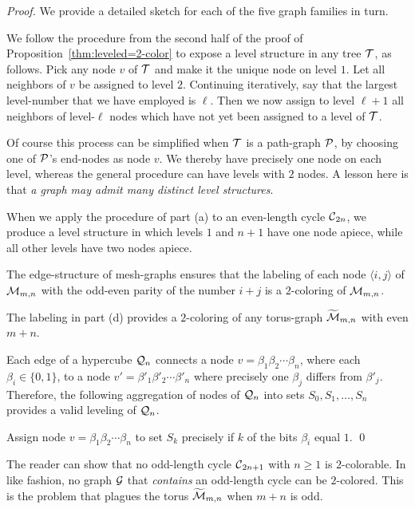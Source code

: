 \begin{proof}
We provide a detailed sketch for each of the five graph families in
turn.

We follow the procedure from the second half of the proof of
Proposition~\ref{thm:leveled=2-color} to expose a level structure in
any tree $\mbox{$\cal T$}$, as follows.  Pick any node $v$ of $\mbox{$\cal T$}$ and make it the
unique node on level $1$.  Let all neighbors of $v$ be assigned to
level $2$.  Continuing iteratively, say that the largest level-number
that we have employed is $\ell$.  Then we now assign to level $\ell
+1$ all neighbors of level-$\ell$ nodes which have not yet been
assigned to a level of $\mbox{$\cal T$}$.

Of course this process can be simplified when $\mbox{$\cal T$}$ is a path-graph
$\mbox{$\cal P$}$, by choosing one of $\mbox{$\cal P$}$'s end-nodes as node $v$.  We thereby
have precisely one node on each level, whereas the general procedure
can have levels with $2$ nodes.  A lesson here is that {\em a graph
  may admit many distinct level structures}.

\medskip

When we apply the procedure of part (a) to an even-length cycle
$\mbox{$\cal C$}_{2n}$, we produce a level structure in which levels $1$ and $n+1$
have one node apiece, while all other levels have two nodes apiece.

\medskip

The edge-structure of mesh-graphs ensures that the labeling of each
node $\langle i,j \rangle$ of $\mbox{$\cal M$}_{m,n}$ with the odd-even parity of
the number $i+j$ is a $2$-coloring of $\mbox{$\cal M$}_{m,n}$.

\medskip

The labeling in part (d) provides a $2$-coloring of any torus-graph
$\widetilde{\mbox{$\cal M$}}_{m,n}$ with even $m+n$.

\medskip

Each edge of a hypercube $\mbox{$\cal Q$}_n$ connects a node $v = \beta_1 \beta_2
\cdots \beta_n$, where each $\beta_i \in \{0,1\}$, to a node $v' =
\beta'_1 \beta'_2 \cdots \beta'_n$ where precisely one $\beta_j$
differs from $\beta'_j$.  Therefore, the following aggregation of
nodes of $\mbox{$\cal Q$}_n$ into sets $S_0, S_1, \ldots, S_n$ provides a valid
leveling of $\mbox{$\cal Q$}_n$.

Assign node $v = \beta_1 \beta_2 \cdots \beta_n$ to set $S_k$
precisely if $k$ of the bits $\beta_i$ equal $1$.
\qed
\end{proof}

The reader can show that no odd-length cycle $\mbox{$\cal C$}_{2n+1}$ with $n \geq
1$ is $2$-colorable.  In like fashion, no graph $\mbox{$\cal G$}$ that {\em
  contains} an odd-length cycle can be $2$-colored.  This is the
problem that plagues the torus $\widetilde{\mbox{$\cal M$}}_{m,n}$ when $m+n$ is
odd.

